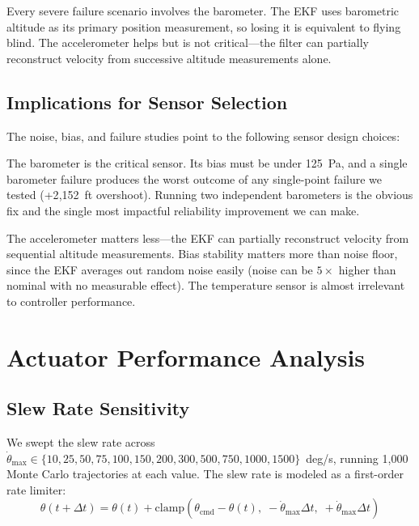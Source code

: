 \documentclass[11pt,letterpaper]{article}
\begin{document}
Every severe failure scenario involves the barometer. The EKF uses barometric altitude as its primary position measurement, so losing it is equivalent to flying blind. The accelerometer helps but is not critical---the filter can partially reconstruct velocity from successive altitude measurements alone.

\subsection{Implications for Sensor Selection}
\label{sec:sensor_selection}

The noise, bias, and failure studies point to the following sensor design choices:

The barometer is the critical sensor. Its bias must be under 125~Pa, and a single barometer failure produces the worst outcome of any single-point failure we tested (+2{,}152~ft overshoot). Running two independent barometers is the obvious fix and the single most impactful reliability improvement we can make.

The accelerometer matters less---the EKF can partially reconstruct velocity from sequential altitude measurements. Bias stability matters more than noise floor, since the EKF averages out random noise easily (noise can be $5\times$ higher than nominal with no measurable effect). The temperature sensor is almost irrelevant to controller performance.


\section{Actuator Performance Analysis}
\label{sec:actuator}

\subsection{Slew Rate Sensitivity}
\label{sec:slew_rate}

We swept the slew rate across $\dot{\theta}_{\max} \in \{10, 25, 50, 75, 100, 150, 200, 300, 500, 750, 1000, 1500\}$~deg/s, running 1{,}000 Monte Carlo trajectories at each value. The slew rate is modeled as a first-order rate limiter:
\begin{equation}
    \theta(t + \Delta t) = \theta(t) + \text{clamp}\left(\theta_{\text{cmd}} - \theta(t), \; -\dot{\theta}_{\max} \Delta t, \; +\dot{\theta}_{\max} \Delta t\right)
    \label{eq:slew_model}
\end{equation}
\end{document}
